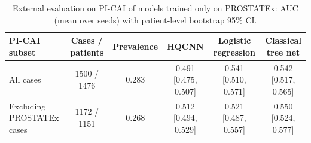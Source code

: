 \begin{table}[tbp]
\centering
\caption{External evaluation on PI-CAI of models trained only on PROSTATEx: AUC (mean over seeds) with patient-level bootstrap 95\% CI.}
\label{tab:main_picai}
\footnotesize
\begin{tabular}{lccccc}
\toprule
PI-CAI subset & Cases / patients & Prevalence & HQCNN & Logistic regression & Classical tree net \\
\midrule
All cases & \num{1500} / \num{1476} & \num{0.283} & \num{0.491} [\num{0.475}, \num{0.507}] & \num{0.541} [\num{0.510}, \num{0.571}] & \num{0.542} [\num{0.517}, \num{0.565}] \\
Excluding PROSTATEx cases & \num{1172} / \num{1151} & \num{0.268} & \num{0.512} [\num{0.494}, \num{0.529}] & \num{0.521} [\num{0.487}, \num{0.557}] & \num{0.550} [\num{0.524}, \num{0.577}] \\
\bottomrule
\end{tabular}
\par{}
\end{table}
